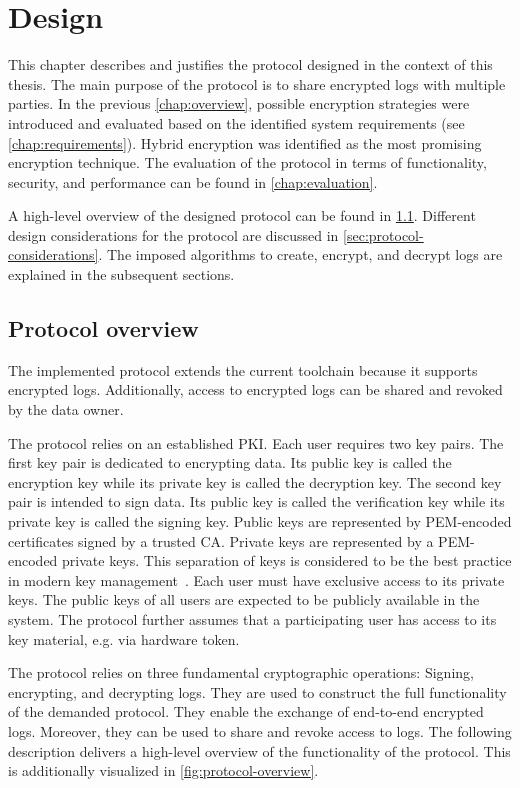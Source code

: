 \documentclass[../main.tex]{subfiles}
\begin{document}
\chapter{Design}
\label{chap:design}

This chapter describes and justifies the protocol designed in the context of this thesis.
The main purpose of the protocol is to share encrypted logs with multiple parties.
In the previous \cref{chap:overview}, possible encryption strategies were introduced and evaluated based on the identified system requirements (see \cref{chap:requirements}).
Hybrid encryption was identified as the most promising encryption technique.
The evaluation of the protocol in terms of functionality, security, and performance can be found in \cref{chap:evaluation}.

A high-level overview of the designed protocol can be found in \cref{sec:overview}.
Different design considerations for the protocol are discussed in \cref{sec:protocol-considerations}.
The imposed algorithms to create, encrypt, and decrypt logs are explained in the subsequent sections. 

\section{Protocol overview}
\label{sec:overview}

The implemented protocol extends the current toolchain because it supports encrypted logs.
Additionally, access to encrypted logs can be shared and revoked by the data owner.

The protocol relies on an established PKI.
Each user requires two key pairs.
The first key pair is dedicated to encrypting data.
Its public key is called the encryption key while its private key is called the decryption key.
The second key pair is intended to sign data.
Its public key is called the verification key while its private key is called the signing key.
Public keys are represented by PEM-encoded certificates signed by a trusted CA.
Private keys are represented by a PEM-encoded private keys.
This separation of keys is considered to be the best practice in modern key management~\cite[33]{Barker2006}.
Each user must have exclusive access to its private keys.
The public keys of all users are expected to be publicly available in the system.
The protocol further assumes that a participating user has access to its key material, e.g. via hardware token.

The protocol relies on three fundamental cryptographic operations:
Signing, encrypting, and decrypting logs.
They are used to construct the full functionality of the demanded protocol.
They enable the exchange of end-to-end encrypted logs.
Moreover, they can be used to share and revoke access to logs.
The following description delivers a high-level overview of the functionality of the protocol.
This is additionally visualized in \cref{fig:protocol-overview}.
\end{document}
